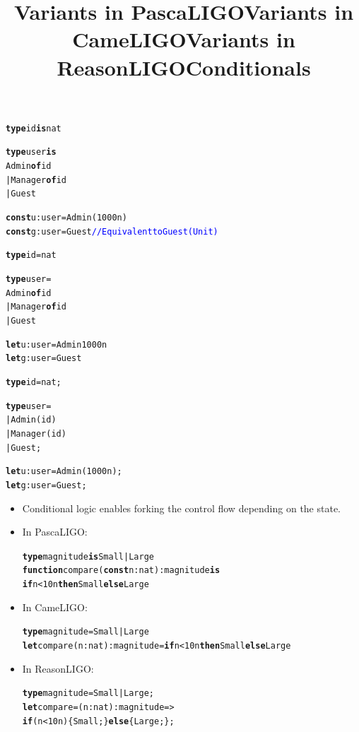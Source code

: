 \documentclass[wide]{slides}
\newcommand{\Kconst}[0]{\textbf{const}\xspace}
\newcommand{\Kelse}[0]{\textbf{else}\xspace}
\newcommand{\Kfunction}[0]{\textbf{function}\xspace}
\newcommand{\Kif}[0]{\textbf{if}\xspace}
\newcommand{\Kis}[0]{\textbf{is}\xspace}
\newcommand{\Kof}[0]{\textbf{of}\xspace}
\newcommand{\Kthen}[0]{\textbf{then}\xspace}
\newcommand{\Ktype}[0]{\textbf{type}\xspace}
\newcommand{\Klet}[0]{\textbf{let}\xspace}
\newcommand{\com}[1]{\textcolor{blue}{{#1}}}
\begin{document}
\begin{slide}
  \title{Variants in PascaLIGO}

\begin{alltt}
\Ktype id \Kis nat

\Ktype user \Kis
  Admin   \Kof id
| Manager \Kof id
| Guest

\Kconst u : user = Admin (1000n)
\Kconst g : user = Guest         \com{// Equivalent to Guest (Unit)}
\end{alltt}

\end{slide}

\begin{slide}
  \title{Variants in CameLIGO}

\begin{alltt}
\Ktype id = nat

\Ktype user =
  Admin   \Kof id
| Manager \Kof id
| Guest

\Klet u : user = Admin 1000n
\Klet g : user = Guest
\end{alltt}

\end{slide}

\begin{slide}
  \title{Variants in ReasonLIGO}

\begin{alltt}
\Ktype id = nat;

\Ktype user =
| Admin   (id)
| Manager (id)
| Guest;

\Klet u : user = Admin (1000n);
\Klet g : user = Guest;
\end{alltt}

\end{slide}

\begin{slide}
  \title{Conditionals}

  \begin{itemize}

    \item Conditional logic enables forking the control flow depending
      on the state.

    \item In PascaLIGO:
      \begin{alltt}
\Ktype magnitude \Kis Small | Large
\Kfunction compare (\Kconst n : nat) : magnitude \Kis
  \Kif n < 10n \Kthen Small \Kelse Large
      \end{alltt}

    \item In CameLIGO:
      \begin{alltt}
\Ktype magnitude = Small | Large
\Klet compare (n : nat) : magnitude = \Kif n < 10n \Kthen Small \Kelse Large
      \end{alltt}

    \item In ReasonLIGO:
      \begin{alltt}
\Ktype magnitude = Small | Large;
\Klet compare = (n : nat) : magnitude =>
  \Kif (n < 10n) \{ Small; \} \Kelse \{ Large; \};
      \end{alltt}

  \end{itemize}

\end{slide}
\end{document}
